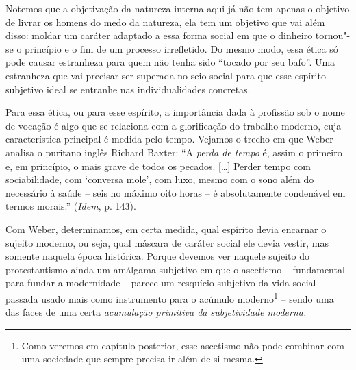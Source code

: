 Notemos que a objetivação da natureza interna aqui já não tem
apenas o objetivo de livrar os homens do medo da natureza, ela tem um
objetivo que vai além disso: moldar um caráter adaptado a essa forma
social em que o dinheiro tornou"-se o princípio e o fim de um processo
irrefletido. Do mesmo modo, essa ética só pode causar estranheza para
quem não tenha sido ``tocado por seu bafo''. Uma estranheza que vai
precisar ser superada no seio social para que esse espírito subjetivo
ideal se entranhe nas individualidades concretas.

Para essa ética, ou para esse espírito, a importância dada à profissão
sob o nome de vocação é algo que se relaciona com a glorificação do
trabalho moderno, cuja característica principal é medida pelo tempo.
Vejamos o trecho em que Weber analisa o puritano inglês Richard Baxter:
``A \emph{perda de tempo} é, assim o primeiro e, em princípio, o mais
grave de todos os pecados. [\ldots{}] Perder tempo com
sociabilidade, com `conversa mole', com luxo, mesmo com o sono além do
necessário à saúde -- seis no máximo oito horas -- é absolutamente
condenável em termos morais.'' (\emph{Idem}, p. 143).

Com Weber, determinamos, em certa medida, qual espírito devia encarnar o
sujeito moderno, ou seja, qual máscara de caráter social ele devia
vestir, mas somente naquela época histórica. Porque devemos ver
naquele sujeito do protestantismo ainda um amálgama
subjetivo em que o ascetismo -- fundamental para fundar a modernidade --
parece um resquício subjetivo da vida social passada usado mais como
instrumento para o acúmulo moderno\footnote{Como veremos em capítulo
  posterior, esse ascetismo não pode combinar com uma sociedade que
  sempre precisa ir além de si mesma.} -- sendo uma das faces de uma
certa \emph{acumulação primitiva da subjetividade moderna.}

